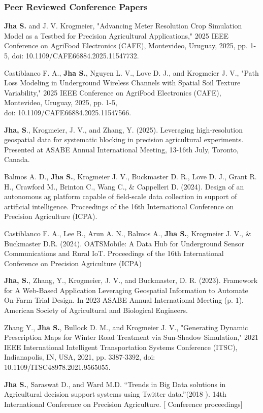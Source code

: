 \documentclass[10pt]{article}
\begin{document}
\subsubsection{Peer Reviewed Conference Papers}
\begin{enumerate}[label={[\arabic*]}, leftmargin=3em, itemsep=0pt, topsep=0pt]
    \item \textbf{Jha S.} and J. V. Krogmeier, "Advancing Meter Resolution Crop Simulation Model as a Testbed for Precision Agricultural Applications," 2025 IEEE Conference on AgriFood Electronics (CAFE), Montevideo, Uruguay, 2025, pp. 1-5, doi: 10.1109/CAFE66884.2025.11547732. 

    \item Castiblanco F. A., \textbf{Jha S.}, Nguyen L. V.,  Love D. J., and  Krogmeier J. V., "Path Loss Modeling in Underground Wireless Channels with Spatial Soil Texture Variability," 2025 IEEE Conference on AgriFood Electronics (CAFE), Montevideo, Uruguay, 2025, pp. 1-5, \\doi: 10.1109/CAFE66884.2025.11547566. 

    \item \textbf{Jha, S}., Krogmeier, J. V., and Zhang, Y. (2025). Leveraging high-resolution geospatial data for systematic blocking in precision agricultural experiments. Presented at ASABE Annual International Meeting, 13-16th July, Toronto, Canada.
    
    \item Balmos A. D., \textbf{Jha S.}, Krogmeier J. V., Buckmaster D. R., Love D. J., Grant R. H., Crawford M., Brinton C., Wang C., \& Cappelleri D. (2024). Design of an autonomous ag platform capable of field-scale data collection in support of artificial intelligence. Proceedings of the 16th International Conference on Precision Agriculture (ICPA).
    
    \item Castiblanco F. A., Lee B., Arun A. N., Balmos A., \textbf{Jha S.}, Krogmeier J. V., \& Buckmaster D.R. (2024). OATSMobile: A Data Hub for Underground Sensor Communications and Rural IoT. Proceedings of the 16th International Conference on Precision Agriculture (ICPA)
    
    \item \textbf{Jha, S.}, Zhang, Y., Krogmeier, J. V., and Buckmaster, D. R. (2023). Framework for A Web-Based Application Leveraging Geospatial Information to Automate On-Farm Trial Design. In 2023 ASABE Annual International Meeting (p. 1). American Society of Agricultural and Biological Engineers.
    
    \item Zhang Y., \textbf{Jha S.}, Bullock D. M., and Krogmeier J. V., "Generating Dynamic Prescription Maps for Winter Road Treatment via Sun-Shadow Simulation," 2021 IEEE International Intelligent Transportation Systems Conference (ITSC), Indianapolis, IN, USA, 2021, pp. 3387-3392, doi: 10.1109/ITSC48978.2021.9565055.
    
    \item \textbf{Jha S.}, Saraswat D., and Ward M.D. “Trends in Big Data solutions in Agricultural decision support systems using Twitter data.”(2018 ). 14th International Conference on Precision Agriculture. [ Conference proceedings]
\end{enumerate}
\end{document}
